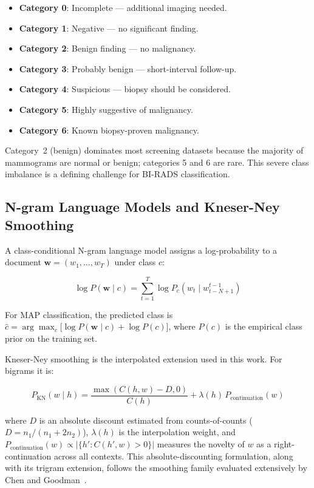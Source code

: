 \documentclass[11pt,a4paper]{article}
\begin{document}
\begin{itemize}
  \item \textbf{Category 0}: Incomplete --- additional imaging needed.
  \item \textbf{Category 1}: Negative --- no significant finding.
  \item \textbf{Category 2}: Benign finding --- no malignancy.
  \item \textbf{Category 3}: Probably benign --- short-interval follow-up.
  \item \textbf{Category 4}: Suspicious --- biopsy should be considered.
  \item \textbf{Category 5}: Highly suggestive of malignancy.
  \item \textbf{Category 6}: Known biopsy-proven malignancy.
\end{itemize}

Category~2 (benign) dominates most screening datasets because the majority of
mammograms are normal or benign; categories 5 and 6 are rare.
This severe class imbalance is a defining challenge for BI-RADS classification.

\subsection{N-gram Language Models and Kneser-Ney Smoothing}

A class-conditional N-gram language model assigns a log-probability to a
document $\mathbf{w} = (w_1, \ldots, w_T)$ under class $c$:

\begin{equation}
  \log P(\mathbf{w} \mid c)
  = \sum_{t=1}^{T} \log P_c(w_t \mid w_{t-N+1}^{t-1})
\end{equation}

For MAP classification, the predicted class is
$\hat{c} = \arg\max_c \bigl[\log P(\mathbf{w}\mid c) + \log P(c)\bigr]$,
where $P(c)$ is the empirical class prior on the training set.

Kneser-Ney smoothing \cite{kneser1995improved} is the interpolated extension
used in this work.
For bigrams it is:

\begin{equation}
  P_{\text{KN}}(w \mid h) =
    \frac{\max(C(h,w) - D, 0)}{C(h)}
    + \lambda(h)\,P_{\text{continuation}}(w)
\end{equation}

where $D$ is an absolute discount estimated from counts-of-counts
($D = n_1 / (n_1 + 2n_2)$), $\lambda(h)$ is the interpolation weight,
and $P_{\text{continuation}}(w) \propto |\{h' : C(h',w) > 0\}|$ measures the
novelty of $w$ as a right-continuation across all contexts. This absolute-discounting
formulation, along with its trigram extension, follows the smoothing family
evaluated extensively by Chen and Goodman~\cite{chen1998evaluation}.
\end{document}
